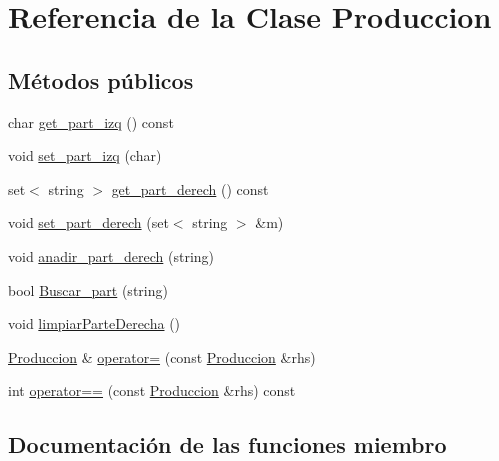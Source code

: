 \hypertarget{class_produccion}{}\section{Referencia de la Clase Produccion}
\label{class_produccion}
\subsection*{Métodos públicos}
\begin{DoxyCompactItemize}
\item 
char \hyperlink{class_produccion_ac863aa129550b93bf54b8c6489b432fe}{get\+\_\+part\+\_\+izq} () const
\item 
void \hyperlink{class_produccion_a9bb0be1c947951dd47a2527ada53defc}{set\+\_\+part\+\_\+izq} (char)
\item 
set$<$ string $>$ \hyperlink{class_produccion_abc0510dbd1ebecee94737417b9735414}{get\+\_\+part\+\_\+derech} () const
\item 
void \hyperlink{class_produccion_ab3798028b2059c77c58514ef318ace5b}{set\+\_\+part\+\_\+derech} (set$<$ string $>$ \&m)
\item 
void \hyperlink{class_produccion_a03c832739efee38f117d6b33e3c11c54}{anadir\+\_\+part\+\_\+derech} (string)
\item 
bool \hyperlink{class_produccion_a2192f45a1caead0e79d9a043cf22bc10}{Buscar\+\_\+part} (string)
\item 
void \hyperlink{class_produccion_a0a3069bb47b350abd3adcd82a0aa0f3c}{limpiar\+Parte\+Derecha} ()
\item 
\hyperlink{class_produccion}{Produccion} \& \hyperlink{class_produccion_a31a114a57efbe80598cdfc5b739ed3b4}{operator=} (const \hyperlink{class_produccion}{Produccion} \&rhs)
\item 
int \hyperlink{class_produccion_a42b1202a9a4904c19d6af60be18936cd}{operator==} (const \hyperlink{class_produccion}{Produccion} \&rhs) const
\end{DoxyCompactItemize}


\subsection{Documentación de las funciones miembro}
\mbox{\label{class_produccion_a03c832739efee38f117d6b33e3c11c54}} 

